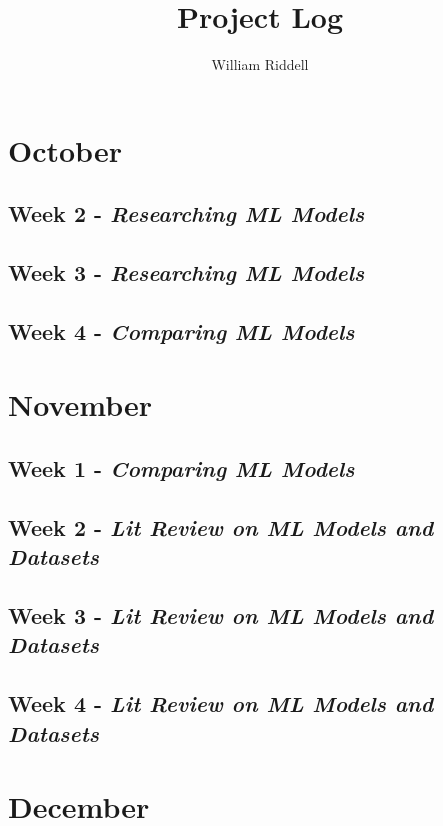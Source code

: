 \documentclass[12pt]{article}
\title{Project Log}
\author{William Riddell}
\begin{document}
\maketitle
\pagebreak
\tableofcontents

\section{October}

\subsection{Week 2
- \textit{Researching ML Models}}



\subsection{Week 3
- \textit{Researching ML Models}}


\subsection{Week 4
- \textit{Comparing ML Models}}




\section{November}

\subsection{Week 1
- \textit{Comparing ML Models}}


\subsection{Week 2
- \textit{Lit Review on ML Models and Datasets}}
\subsection{Week 3
- \textit{Lit Review on ML Models and Datasets}}
\subsection{Week 4
- \textit{Lit Review on ML Models and Datasets}}

\section{December}
\end{document}

